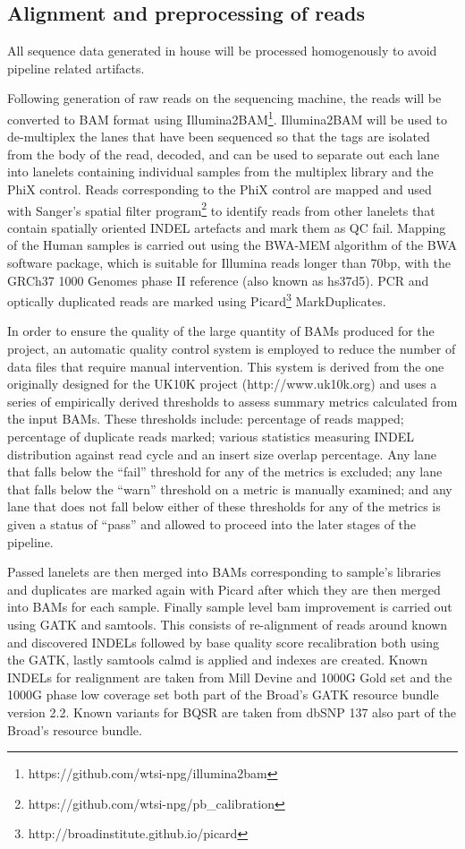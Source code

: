 \subsection{Alignment and preprocessing of reads}
All sequence data generated in house will be processed homogenously to avoid pipeline related artifacts.


Following generation of raw reads on the sequencing machine, the reads will be converted to BAM format using Illumina2BAM\footnote{https://github.com/wtsi-npg/illumina2bam}. Illumina2BAM will be used to de-multiplex the lanes that have been sequenced so that the tags are isolated from the body of the read, decoded, and can be used to separate out each lane into lanelets containing individual samples from the multiplex library and the PhiX control.  Reads corresponding to the PhiX control are mapped and used with Sanger’s spatial filter program\footnote{https://github.com/wtsi-npg/pb_calibration} to identify reads from other lanelets that contain spatially oriented INDEL artefacts and mark them as QC fail. Mapping  of the Human samples is carried out using the BWA-MEM algorithm of the BWA software package, which is suitable for Illumina reads longer than 70bp\cite{2013arXiv1303.3997L}, with the GRCh37 1000 Genomes phase II reference (also known as hs37d5). PCR and optically duplicated reads are marked using Picard\footnote{http://broadinstitute.github.io/picard} MarkDuplicates.

In order to ensure the quality of the large quantity of BAMs produced for the project, an automatic quality control system is employed to reduce the number of data files that require manual intervention. This system is derived from the one originally designed for the UK10K  project (http://www.uk10k.org) and uses a series of empirically derived thresholds to assess summary metrics calculated from the input BAMs. These thresholds include: percentage of reads mapped; percentage of duplicate reads marked; various statistics measuring INDEL distribution against read cycle and an insert size overlap percentage. Any lane that falls below the “fail” threshold for any of the metrics is excluded; any lane that falls below the “warn” threshold on a metric is manually examined; and any lane that does not fall below either of these thresholds for any of the metrics is given a status of “pass” and allowed to proceed into the later stages of the pipeline.

Passed lanelets are then merged into BAMs corresponding to sample’s libraries and duplicates are marked again with Picard after which they are then merged into BAMs for each sample.  Finally sample level bam improvement is carried out using GATK\cite{McKenna01092010}\cite{DePristo2011} and samtools\cite{Li15082009}. This consists of re-alignment of reads around known and discovered INDELs followed by base quality score recalibration both using the GATK, lastly samtools calmd is applied and indexes are created.  Known INDELs for realignment are taken from Mill Devine and 1000G Gold set and the 1000G phase low coverage set both part of the Broad’s GATK resource bundle version 2.2. Known variants for BQSR are taken from dbSNP 137 also part of the Broad’s resource bundle. 

